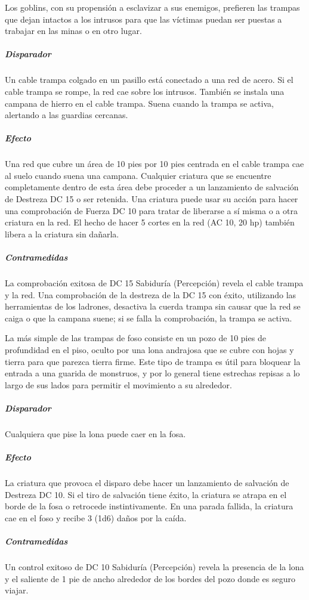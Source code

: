 \documentclass[a4paper,twocolumn,openany,10pt]{dndbook}
\begin{document}
Los goblins, con su propensión a esclavizar a sus enemigos, prefieren las trampas que dejan intactos a los intrusos para que las
víctimas puedan ser puestas a trabajar en las minas o en otro lugar.

\subparagraph{Disparador} Un cable trampa colgado en un pasillo está conectado a una red de acero. Si el cable trampa se rompe,
la red cae sobre los intrusos. También se instala una campana de hierro en el cable trampa. Suena cuando la trampa se activa,
alertando a las guardias cercanas.

\subparagraph{Efecto} Una red que cubre un área de 10 pies por 10 pies centrada en el cable trampa cae al suelo cuando suena una
campana. Cualquier criatura que se encuentre completamente dentro de esta área debe proceder a un lanzamiento de salvación de
Destreza DC 15 o ser retenida. Una criatura puede usar su acción para hacer una comprobación de Fuerza DC 10 para tratar de
liberarse a sí misma o a otra criatura en la red. El hecho de hacer 5 cortes en la red (AC 10, 20 hp) también libera a la
criatura sin dañarla.

\subparagraph{Contramedidas} La comprobación exitosa de DC 15 Sabiduría (Percepción) revela el cable trampa y la red. Una
comprobación de la destreza de la DC 15 con éxito, utilizando las herramientas de los ladrones, desactiva la cuerda trampa sin
causar que la red se caiga o que la campana suene; si se falla la comprobación, la trampa se activa.

La más simple de las trampas de foso consiste en un pozo de 10 pies de profundidad en el piso, oculto por una lona andrajosa que
se cubre con hojas y tierra para que parezca tierra firme. Este tipo de trampa es útil para bloquear la entrada a una guarida de
monstruos, y por lo general tiene estrechas repisas a lo largo de sus lados para permitir el movimiento a su alrededor.

\subparagraph{Disparador} Cualquiera que pise la lona puede caer en la fosa.

\subparagraph{Efecto} La criatura que provoca el disparo debe hacer un lanzamiento de salvación de Destreza DC 10. Si el tiro de
salvación tiene éxito, la criatura se atrapa en el borde de la fosa o retrocede instintivamente. En una parada fallida, la
criatura cae en el foso y recibe 3 (1d6) daños por la caída.

\subparagraph{Contramedidas} Un control exitoso de DC 10 Sabiduría (Percepción) revela la presencia de la lona y el saliente de
1 pie de ancho alrededor de los bordes del pozo donde es seguro viajar.
\end{document}
